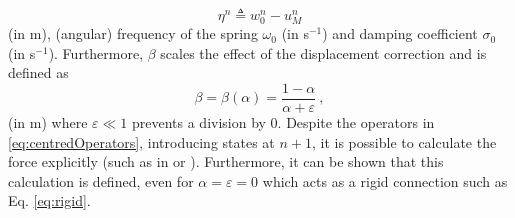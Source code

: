\begin{equation}
    \eta^n \triangleq w_0^n - u_M^n 
\end{equation}
(in m), (angular) frequency of the spring $\omega_0$ (in s$^{-1}$) and damping coefficient $\sigma_0$ (in s$^{-1}$). Furthermore, $\beta$ scales the effect of the displacement correction and is defined as
\begin{equation}\label{eq:betaDef}
    \beta = \beta(\alpha) = \frac{1-\alpha}{\alpha + \varepsilon}\ ,
\end{equation}
(in m)  where $\varepsilon \ll 1$ prevents a division by 0. Despite the operators in \eqref{eq:centredOperators}, introducing states at $n+1$, it is possible to calculate the force explicitly (such as in \cite{bilbao2009} or \cite{bilbao2009Dafx}). Furthermore, it can be shown that this calculation is defined, even for $\alpha  = \varepsilon = 0$     \MDcomment[And how is the connection rigid when $\alpha = 0$?  Shouldn't a rigid connection have $\beta \rightarrow \infty$ ] \SWcomment[but it does! As I say, when $\epsilon = 0$ and $\alpha = 0$, $\beta\rightarrow \infty$. $\beta$ is simply a function that goes ("asymptotically") from $0$ to $\infty$ as $\alpha$ goes from $1$ to $0$] which acts as a rigid connection such as Eq. \eqref{eq:rigid}. 
